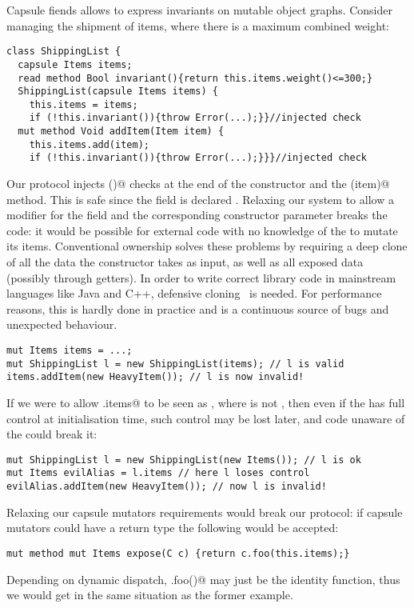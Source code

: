Capsule fiends allows to express invariants on mutable object graphs.
Consider managing the shipment of items, where there is a maximum combined weight:
\begin{lstlisting}
class ShippingList {
  capsule Items items;
  read method Bool invariant(){return this.items.weight()<=300;}
  ShippingList(capsule Items items) {
    this.items = items;
    if (!this.invariant()){throw Error(...);}}//injected check
  mut method Void addItem(Item item) {
    this.items.add(item);
    if (!this.invariant()){throw Error(...);}}}//injected check
\end{lstlisting}
Our protocol injects \Q@invariant()@ checks at the end of the constructor and the \Q@addItem(item)@ method.
This is safe since the \Q@items@ field is declared \Q@capsule@.
Relaxing our system to allow a \Q@mut@ modifier for
the \Q@items@ field and the corresponding constructor parameter 
breaks the code:
it would be possible for external code with no knowledge of the \Q@ShippingList@ to mutate its items.%
Conventional ownership solves these problems by requiring a deep clone of all the data the constructor takes as input, as well as all exposed data (possibly through getters).
In order to write correct library code in mainstream languages like Java and C++, defensive cloning~\cite{Bloch08} is needed.
For performance reasons, this is hardly done in practice and is a continuous source of bugs and unexpected behaviour.%

\begin{lstlisting}
mut Items items = ...;
mut ShippingList l = new ShippingList(items); // l is valid
items.addItem(new HeavyItem()); // l is now invalid!
\end{lstlisting}
If we were to allow \Q@x.items@ to be seen as \Q@mut@, where \Q@x@ is not \Q@this@, then  even if the \Q@ShippingList@ has full control at initialisation time, such control may be lost later, and code unaware of the \Q@ShippingList@ could break it:
\begin{lstlisting}
mut ShippingList l = new ShippingList(new Items()); // l is ok
mut Items evilAlias = l.items // here l loses control
evilAlias.addItem(new HeavyItem()); // now l is invalid!
\end{lstlisting}
Relaxing our capsule mutators requirements
would break our protocol: if capsule mutators could have a \Q@mut@ return type the following would be accepted:
\begin{lstlisting}
mut method mut Items expose(C c) {return c.foo(this.items);}
\end{lstlisting}
Depending on dynamic dispatch, \Q@c.foo()@ may just be the identity function, thus
we would get in the same situation as the former example.


